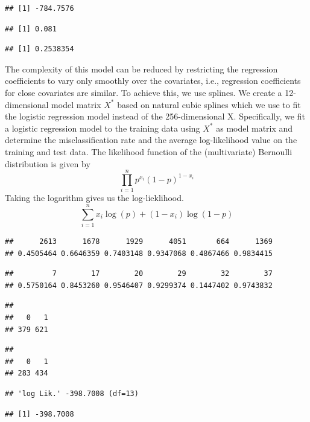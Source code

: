 \documentclass[
]{article}
\begin{document}
\begin{verbatim}
## [1] -784.7576
\end{verbatim}

\begin{verbatim}
## [1] 0.081
\end{verbatim}

\begin{verbatim}
## [1] 0.2538354
\end{verbatim}

The complexity of this model can be reduced by restricting the
regression coefficients to vary only smoothly over the covariates, i.e.,
regression coefficients for close covariates are similar. To achieve
this, we use splines. We create a 12-dimensional model matrix \(X^*\)
based on natural cubic splines which we use to fit the logistic
regression model instead of the 256-dimensional X. Specifically, we fit
a logistic regression model to the training data using \(X^*\) as model
matrix and determine the misclassification rate and the average
log-likelihood value on the training and test data. The likelihood
function of the (multivariate) Bernoulli distribution is given by
\[\prod_{i=1}^n p^{x_i}(1-p)^{1-x_i}\] Taking the logarithm gives us the
log-lieklihood. \[ \sum_{i=1}^n x_i \log(p)+(1-x_i)\log(1-p) \]

\begin{verbatim}
##      2613      1678      1929      4051       664      1369 
## 0.4505464 0.6646359 0.7403148 0.9347068 0.4867466 0.9834415
\end{verbatim}

\begin{verbatim}
##         7        17        20        29        32        37 
## 0.5750164 0.8453260 0.9546407 0.9299374 0.1447402 0.9743832
\end{verbatim}

\begin{verbatim}
## 
##   0   1 
## 379 621
\end{verbatim}

\begin{verbatim}
## 
##   0   1 
## 283 434
\end{verbatim}

\begin{verbatim}
## 'log Lik.' -398.7008 (df=13)
\end{verbatim}

\begin{verbatim}
## [1] -398.7008
\end{verbatim}
\end{document}
